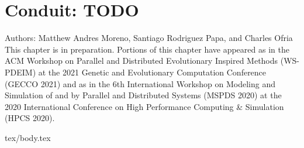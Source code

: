 \chapter{Conduit: TODO}
\label{ch:conduit}

\noindent
Authors: Matthew Andres Moreno, Santiago Rodriguez Papa, and Charles Ofria \\
This chapter is in preparation.
Portions of this chapter have appeared as \citep{moreno2021conduit} in the ACM Workshop on Parallel and Distributed Evolutionary Inspired Methods (WS-PDEIM) at the 2021 Genetic and Evolutionary Computation Conference (GECCO 2021) and as \citep{moreno2020conduit} in the 6th International Workshop on Modeling and Simulation of and by Parallel and Distributed Systems (MSPDS 2020) at the 2020 International Conference on High Performance Computing \& Simulation (HPCS 2020).

{tex/body.tex}
